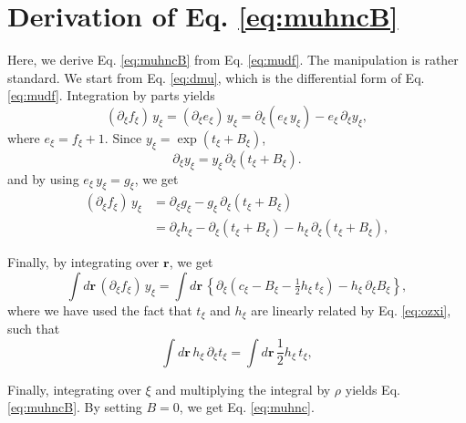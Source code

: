 \documentclass[preprint]{revtex4-1}
\newcommand{\vct}[1]{\mathbf{#1}}
\providecommand{\vr}{} %
\renewcommand{\vr}{\vct{r}}
\begin{document}
\appendix



\section{\label{sec:muhncB} Derivation of Eq. \eqref{eq:muhncB}}


Here, we derive Eq. \eqref{eq:muhncB} from Eq. \eqref{eq:mudf}.
%
The manipulation is rather standard\cite{singer1985}.
%
We start from Eq. \eqref{eq:dmu},
which is the differential form of Eq. \eqref{eq:mudf}.
%
Integration by parts yields
\[
(\partial_\xi f_\xi) \, y_\xi
=
(\partial_\xi e_\xi) \, y_\xi
= \partial_\xi ( e_\xi \, y_\xi )
- e_\xi \, \partial_\xi y_\xi,
\]
where $e_\xi = f_\xi + 1$.
%
Since $y_\xi = \exp( t_\xi + B_\xi )$,
\[
  \partial_\xi y_\xi = y_\xi \, \partial_\xi( t_\xi + B_\xi).
\]
and by using $e_\xi \, y_\xi = g_\xi$, we get
\begin{align*}
(\partial_\xi f_\xi) \, y_\xi
&= \partial_\xi g_\xi
- g_\xi \, \partial_\xi (t_\xi + B_\xi)
\\
&= \partial_\xi h_\xi
- \partial_\xi (t_\xi + B_\xi)
- h_\xi \, \partial_\xi (t_\xi + B_\xi),
\end{align*}


Finally, by integrating over $\vr$, we get
\[
\int d\vr \, (\partial_\xi f_\xi) \, y_\xi
=
\int d\vr \, \left\{
  \partial_\xi (c_\xi - B_\xi - \tfrac{1}{2} h_\xi \, t_\xi)
- h_\xi \, \partial_\xi B_\xi \right\},
\]
where we have used the fact that
$t_\xi$ and $h_\xi$ are linearly related by
Eq. \eqref{eq:ozxi}, such that
\[
\int d\vr \, h_\xi \, \partial_\xi t_\xi
= \int d\vr \, \frac{1}{2} h_\xi \, t_\xi,
\]

Finally, integrating over $\xi$
and multiplying the integral by $\rho$
yields Eq. \eqref{eq:muhncB}.
%
By setting $B = 0$, we get Eq. \eqref{eq:muhnc}.




\end{document}

